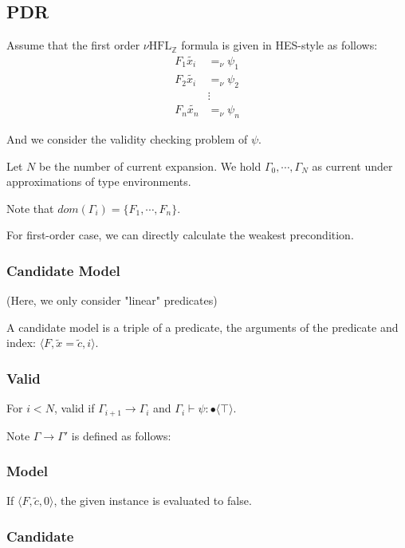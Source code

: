 \documentclass[runningheads]{llncs}
\newcommand \nhz{\(\nu\text{HFL}_\mathbb{Z}\)}
\newcommand \stypebool {\bullet}
\newcommand \typebool[1]{\stypebool \langle #1 \rangle}
\begin{document}
\subsection{PDR}

Assume that the first order \nhz{} formula is given in HES-style as follows:
\begin{align*}
    F_1 \tilde{x_i} &=_{\nu} \psi_1 \\
    F_2 \tilde{x_i} &=_{\nu} \psi_2 \\
    &\vdots\\
    F_n \tilde{x_n} &=_{\nu} \psi_n
\end{align*}

And we consider the validity checking problem of \(\psi\).

Let \(N\) be the number of current expansion. We hold \(\Gamma_0, \cdots,
\Gamma_N\) as current under approximations of type environments.

Note that \(dom(\Gamma_i) = \{F_1, \cdots, F_n\}\).

For first-order case, we can directly calculate the weakest precondition.

\subsubsection{Candidate Model}

(Here, we only consider "linear" predicates)

A candidate model is a triple of a predicate, the arguments of the predicate
and index: \(\langle F, \tilde{x} = \tilde{c}, i\rangle\).

\subsubsection{Valid}

For \(i < N\), valid if \(\Gamma_{i+1} \rightarrow  \Gamma_i\) and \(\Gamma_i
\vdash \psi: \typebool{\top}\).

Note \(\Gamma \rightarrow \Gamma'\) is defined as follows:

\subsubsection{Model}

If \(\langle F, \tilde{c}, 0\rangle\), the given instance is evaluated to false.


\subsubsection{Candidate}
\end{document}
